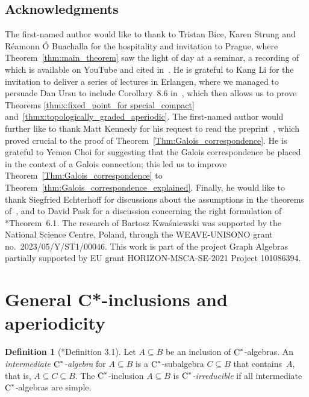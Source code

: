 \documentclass[a4paper]{amsart}
\theoremstyle{plain}
\theoremstyle{definition}
\newtheorem{definition}[theorem]{Definition}
\theoremstyle{remark}
\numberwithin{theorem}{section}
\numberwithin{equation}{section}
\newcommand*{\nb}{\nobreakdash}
\newcommand*{\Cst}{\textup C^*}%
\begin{document}
\subsection*{Acknowledgments}

The first-named author would like to thank to Tristan Bice, Karen
Strung and R\'eamonn \'O Buachalla for the hospitality and invitation
to Prague, where Theorem~\ref{thm:main_theorem} saw the light of day
at a seminar, a recording of which is available on YouTube and cited
in~\cite{Zarikian:Unique_pseudo}.
He is grateful to Kang Li for the invitation to deliver a series of
lectures in Erlangen, where we managed to persuade Dan Ursu to include
Corollary~8.6 in~\cite{Geffen-Ursu:Simple_crossed_products}, which
then allows us to prove Theorems \ref{thmx:fixed_point_for
  special_compact} and~\ref{thmx:topologically_graded_aperiodic}.
The first-named author would further like to thank Matt Kennedy for
his request to read the
preprint~\cite{Kennedy-Ursu:Intermediate_subalgebras_crossed}, which
proved crucial to the proof of
Theorem~\ref{Thm:Galois_correspondence}.
He is grateful to Yemon Choi for suggesting that the Galois
correspondence be placed in the context of a Galois connection; this
led us to improve Theorem~\ref{Thm:Galois_correspondence} to
Theorem~\ref{thm:Galois_correspondence_explained}.
Finally, he would like to thank Siegfried Echterhoff for discussions
about the assumptions in the theorems
of~\cite{Echterhoff-Rordam:Inclusions}, and to David Pask for a
discussion concerning the right formulation of
\cite{Pask-Rho:simple_graph_core}*{Theorem~6.1}.
The research of Bartosz Kwa\'sniewski was supported by the National
Science Centre, Poland, through the WEAVE-UNISONO grant
no.~2023/05/Y/ST1/00046.
This work is part of the project Graph Algebras partially supported by
EU grant HORIZON-MSCA-SE-2021 Project 101086394.


\section{General C*-inclusions and aperiodicity}
\label{sec:General inclusions and aperiodicity}

\begin{definition}[\cite{Rordam:Irreducible_inclusions}*{Definition 3.1}]
  Let \(A\subseteq B\) be an inclusion of \(\Cst\)\nb-algebras.
  An \emph{intermediate \(\Cst\)\nb-algebra} for \(A\subseteq B\) is a
  \(\Cst\)\nb-subalgebra \(C\subseteq B\) that contains~\(A\), that
  is, \(A\subseteq C \subseteq B\).
  The \(\Cst\)\nb-inclusion \(A\subseteq B\) is
  \emph{\(\Cst\)\nb-irreducible} if all intermediate
  \(\Cst\)\nb-algebras are simple.
\end{definition}
\end{document}
